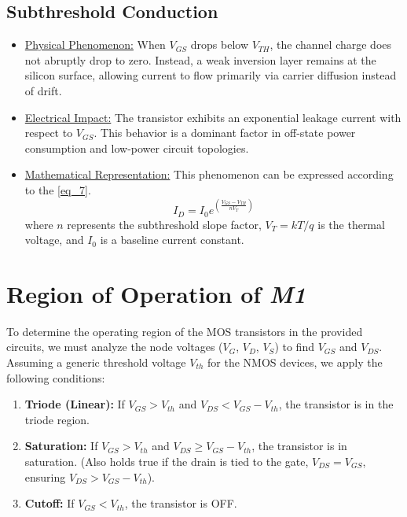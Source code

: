 \documentclass[12pt,a4paper]{article}
\begin{document}
\subsection{Subthreshold Conduction}
\begin{itemize}
    \item \underline{Physical Phenomenon:} When $V_{GS}$ drops below $V_{TH}$, the channel charge does not abruptly drop to zero. Instead, a weak inversion layer remains at the silicon surface, allowing current to flow primarily via carrier diffusion instead of drift.
    \item \underline{Electrical Impact:} The transistor exhibits an exponential leakage current with respect to $V_{GS}$. This behavior is a dominant factor in off-state power consumption and low-power circuit topologies.
    \item \underline{Mathematical Representation:} This phenomenon can be expressed according to the \autoref{eq_7}.
    \begin{equation}
        I_{D} = I_{0} e^{\left( \frac{V_{GS} - V_{TH}}{n V_T} \right)}
        \label{eq_7}
    \end{equation}
    where $n$ represents the subthreshold slope factor, $V_T = kT/q$ is the thermal voltage, and $I_0$ is a baseline current constant.
\end{itemize}



\section{Region of Operation of \textit{M1}}
To determine the operating region of the MOS transistors in the provided circuits, we must analyze the node voltages ($V_G$, $V_D$, $V_S$) to find $V_{GS}$ and $V_{DS}$. Assuming a generic threshold voltage $V_{th}$ for the NMOS devices, we apply the following conditions:
\begin{enumerate}   
    \item \textbf{Triode (Linear):} If $V_{GS} > V_{th}$ and $V_{DS} < V_{GS} - V_{th}$, the transistor is in the triode region.
    \item \textbf{Saturation:} If $V_{GS} > V_{th}$ and $V_{DS} \ge V_{GS} - V_{th}$, the transistor is in saturation. (Also holds true if the drain is tied to the gate, $V_{DS} = V_{GS}$, ensuring $V_{DS} > V_{GS} - V_{th}$).
    \item \textbf{Cutoff:} If $V_{GS} < V_{th}$, the transistor is OFF.
\end{enumerate}
\end{document}
